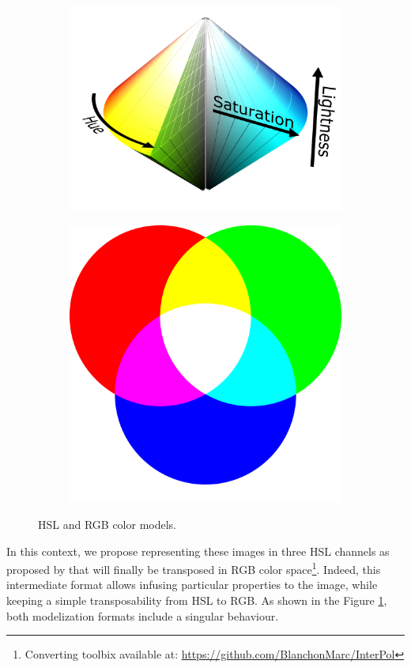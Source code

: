 \begin{figure}[h]
	\centering
	\begin{subfigure}{.4\textwidth}
		\centering
		\includegraphics[width=\linewidth]{Figures/Representation/HSL_block.png}
	\end{subfigure}
	\begin{subfigure}{.4\textwidth}
		
		\centering
		\includegraphics[width=.7\linewidth]{Figures/Representation/RGB_wheel.png}
	\end{subfigure}
	\caption{HSL and RGB color models.}
	\label{fig:hslrgb}
\end{figure}


In this context, we propose representing these images in three HSL channels as proposed by \cite{wolff1995polarization} that will finally be transposed in RGB color space\footnote{Converting toolbix available at: \url{https://github.com/BlanchonMarc/InterPol}}. Indeed, this intermediate format allows infusing particular properties to the image, while keeping a simple transposability from HSL to RGB. As shown in the Figure \ref{fig:hslrgb}, both modelization formats include a singular behaviour.

